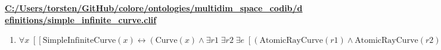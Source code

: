 \documentclass{article}
\begin{document}
\textbf{\url{C:/Users/torsten/GitHub/colore/ontologies/multidim\_space\_codib/definitions/simple\_infinite\_curve.clif}}

\begin{enumerate}
\item $\forall x\;  \left[ \left[ \textrm{SimpleInfiniteCurve}(x) \leftrightarrow \left(\textrm{Curve}(x) \land \exists r1\; \exists r2\; \exists e\;  \left[ \left(\textrm{AtomicRayCurve}(r1) \land \textrm{AtomicRayCurve}(r2) \land \neg \left(\textrm{PO}(r1,r2)\right) \land \textrm{Endpoint}(e,r1) \land \textrm{Endpoint}(e,r2) \land \textrm{PP}(r1,x) \land \textrm{PP}(r2,x) \land \forall y\;  \left[ \left[ \textrm{PP}(y,x) \rightarrow \left(\textrm{PO}(y,r1) \lor \textrm{PO}(y,r2)\right) \right] \right]\right) \right]\right) \right] \right]$
\end{enumerate}
\end{document}
